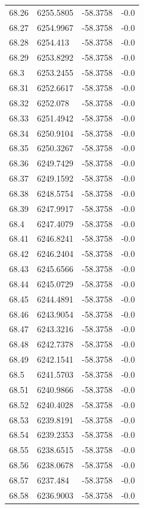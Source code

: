 \begin{table}[H]
\begin{tabular}{llll}
68.26 & 6255.5805 & -58.3758 & -0.0 \\
68.27 & 6254.9967 & -58.3758 & -0.0 \\
68.28 & 6254.413 & -58.3758 & -0.0 \\
68.29 & 6253.8292 & -58.3758 & -0.0 \\
68.3 & 6253.2455 & -58.3758 & -0.0 \\
68.31 & 6252.6617 & -58.3758 & -0.0 \\
68.32 & 6252.078 & -58.3758 & -0.0 \\
68.33 & 6251.4942 & -58.3758 & -0.0 \\
68.34 & 6250.9104 & -58.3758 & -0.0 \\
68.35 & 6250.3267 & -58.3758 & -0.0 \\
68.36 & 6249.7429 & -58.3758 & -0.0 \\
68.37 & 6249.1592 & -58.3758 & -0.0 \\
68.38 & 6248.5754 & -58.3758 & -0.0 \\
68.39 & 6247.9917 & -58.3758 & -0.0 \\
68.4 & 6247.4079 & -58.3758 & -0.0 \\
68.41 & 6246.8241 & -58.3758 & -0.0 \\
68.42 & 6246.2404 & -58.3758 & -0.0 \\
68.43 & 6245.6566 & -58.3758 & -0.0 \\
68.44 & 6245.0729 & -58.3758 & -0.0 \\
68.45 & 6244.4891 & -58.3758 & -0.0 \\
68.46 & 6243.9054 & -58.3758 & -0.0 \\
68.47 & 6243.3216 & -58.3758 & -0.0 \\
68.48 & 6242.7378 & -58.3758 & -0.0 \\
68.49 & 6242.1541 & -58.3758 & -0.0 \\
68.5 & 6241.5703 & -58.3758 & -0.0 \\
68.51 & 6240.9866 & -58.3758 & -0.0 \\
68.52 & 6240.4028 & -58.3758 & -0.0 \\
68.53 & 6239.8191 & -58.3758 & -0.0 \\
68.54 & 6239.2353 & -58.3758 & -0.0 \\
68.55 & 6238.6515 & -58.3758 & -0.0 \\
68.56 & 6238.0678 & -58.3758 & -0.0 \\
68.57 & 6237.484 & -58.3758 & -0.0 \\
68.58 & 6236.9003 & -58.3758 & -0.0 \\

\end{tabular}
\end{table}
